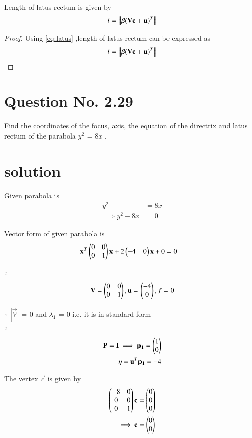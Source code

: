 \documentclass[journal,12pt,twocolumn]{IEEEtran}
\begin{document}
\begin{lemma}
Length of latus rectum is given by 
\begin{align}
l=\left\lVert\beta(\mathbf{V}\mathbf{c}+\mathbf{u})^T\right\rVert \label{eq:length}
\end{align}
\end{lemma}

\begin{proof}
Using \eqref{eq:latus} ,length of latus rectum can be expressed as
\begin{align}
  l=\left\lVert\beta(\mathbf{V}\mathbf{c}+\mathbf{u})^T\right\rVert
\end{align}
\end{proof}

\clearpage
\section{Question No. 2.29}
Find the coordinates of the focus, axis, the equation of the directrix and latus rectum of the parabola $y^2$ = 8$x$ .
%
\section{solution}
Given parabola is 
\begin{align}
y^2 &= 8x
\\
\implies y^2 - 8x &= 0
\end{align}

Vector form of given parabola is
\begin{align}
\mathbf{x}^T\begin{pmatrix}0 & 0 \\ 0 & 1\end{pmatrix}\mathbf{x} + 2\begin{pmatrix}-4 & 0\end{pmatrix}\mathbf{x} + 0 &= 0 
\end{align}

$\therefore$
\begin{align}
 \mathbf{V} = \begin{pmatrix}0 & 0 \\ 0 & 1\end{pmatrix} ,
 \mathbf{u} = \begin{pmatrix}-4\\0\end{pmatrix} ,
 f = 0
\end{align}

$\because$
$|\vec{V}|$ = 0 and $\lambda_1$ = 0 i.e. it is in standard form
\\
$\therefore$
\begin{align}
\mathbf{P}=\mathbf{I} \implies \mathbf{p_1} = \begin{pmatrix}1\\0\end{pmatrix}
\\
\eta = \mathbf{u}^T\mathbf{p_1} = -4
\end{align}

The vertex $\vec{c}$ is given by
\begin{align}
\begin{pmatrix}-8 & 0\\0 & 0\\0 & 1\end{pmatrix}\mathbf{c} &= \begin{pmatrix}0\\0\\0\end{pmatrix}
\\
\implies \mathbf{c} &= \begin{pmatrix}0\\0\end{pmatrix}
\end{align}
\end{document}
